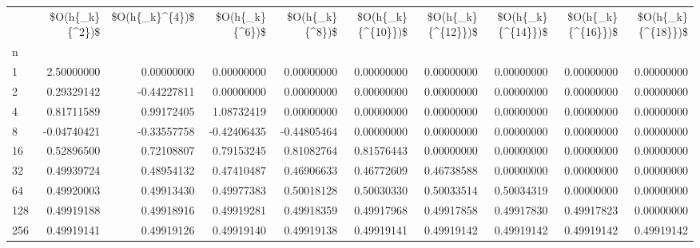 \begin{tabular}{lrrrrrrrrr}
\toprule
{} &  \$O(h\{\_k\}\{\textasciicircum 2\})\$ &  \$O(h\{\_k\}\textasciicircum \{4\})\$ &  \$O(h\{\_k\}\{\textasciicircum 6\})\$ &  \$O(h\{\_k\}\{\textasciicircum 8\})\$ &  \$O(h\{\_k\}\{\textasciicircum \{10\}\})\$ &  \$O(h\{\_k\}\{\textasciicircum \{12\}\})\$ &  \$O(h\{\_k\}\{\textasciicircum \{14\}\})\$ &  \$O(h\{\_k\}\{\textasciicircum \{16\}\})\$ &  \$O(h\{\_k\}\{\textasciicircum \{18\}\})\$ \\
n   &                 &                 &                 &                 &                    &                    &                    &                    &                    \\
\midrule
1   &      2.50000000 &      0.00000000 &      0.00000000 &      0.00000000 &         0.00000000 &         0.00000000 &         0.00000000 &         0.00000000 &         0.00000000 \\
2   &      0.29329142 &     -0.44227811 &      0.00000000 &      0.00000000 &         0.00000000 &         0.00000000 &         0.00000000 &         0.00000000 &         0.00000000 \\
4   &      0.81711589 &      0.99172405 &      1.08732419 &      0.00000000 &         0.00000000 &         0.00000000 &         0.00000000 &         0.00000000 &         0.00000000 \\
8   &     -0.04740421 &     -0.33557758 &     -0.42406435 &     -0.44805464 &         0.00000000 &         0.00000000 &         0.00000000 &         0.00000000 &         0.00000000 \\
16  &      0.52896500 &      0.72108807 &      0.79153245 &      0.81082764 &         0.81576443 &         0.00000000 &         0.00000000 &         0.00000000 &         0.00000000 \\
32  &      0.49939724 &      0.48954132 &      0.47410487 &      0.46906633 &         0.46772609 &         0.46738588 &         0.00000000 &         0.00000000 &         0.00000000 \\
64  &      0.49920003 &      0.49913430 &      0.49977383 &      0.50018128 &         0.50030330 &         0.50033514 &         0.50034319 &         0.00000000 &         0.00000000 \\
128 &      0.49919188 &      0.49918916 &      0.49919281 &      0.49918359 &         0.49917968 &         0.49917858 &         0.49917830 &         0.49917823 &         0.00000000 \\
256 &      0.49919141 &      0.49919126 &      0.49919140 &      0.49919138 &         0.49919141 &         0.49919142 &         0.49919142 &         0.49919142 &         0.49919142 \\
\bottomrule
\end{tabular}
